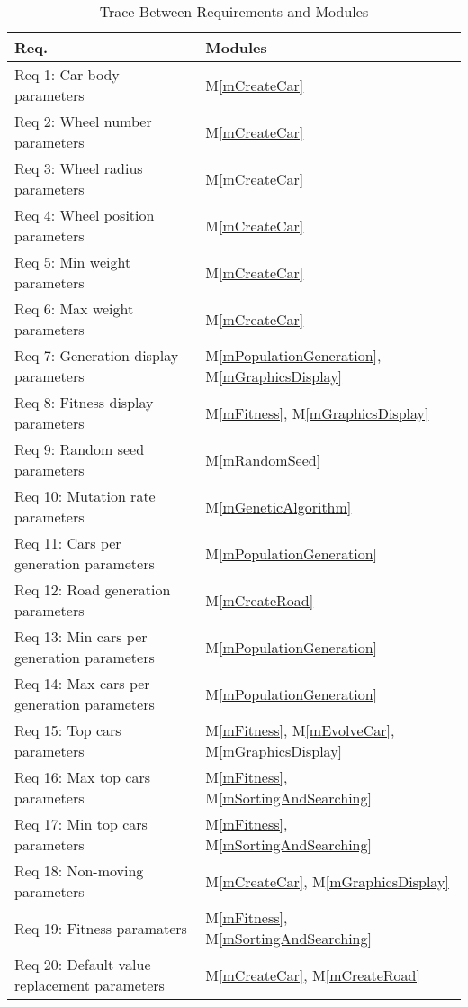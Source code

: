 \documentclass[12pt, titlepage]{article}
\newcommand{\mref}[1]{M\ref{#1}}
\begin{document}
\begin{table}[H]
\centering
\begin{tabular}{p{} p{}}
\toprule
\textbf{Req.} & \textbf{Modules}\\
\midrule
Req 1: Car body parameters & \mref{mCreateCar}\\
Req 2: Wheel number parameters & \mref{mCreateCar}\\
Req 3: Wheel radius parameters & \mref{mCreateCar}\\
Req 4: Wheel position parameters & \mref{mCreateCar}\\
Req 5: Min weight parameters & \mref{mCreateCar}\\
Req 6: Max weight parameters & \mref{mCreateCar}\\
Req 7: Generation display parameters & \mref{mPopulationGeneration}, \mref{mGraphicsDisplay}\\
Req 8: Fitness display parameters & \mref{mFitness}, \mref{mGraphicsDisplay}\\
Req 9: Random seed parameters & \mref{mRandomSeed}\\
Req 10: Mutation rate parameters & \mref{mGeneticAlgorithm}\\
Req 11: Cars per generation parameters &\mref{mPopulationGeneration}\\ 
Req 12: Road generation parameters & \mref{mCreateRoad}\\
Req 13: Min cars per generation parameters & \mref{mPopulationGeneration}\\
Req 14: Max cars per generation parameters & \mref{mPopulationGeneration}\\
Req 15: Top cars parameters & \mref{mFitness}, \mref{mEvolveCar}, \mref{mGraphicsDisplay}\\
Req 16: Max top cars parameters & \mref{mFitness}, \mref{mSortingAndSearching}\\
Req 17: Min top cars parameters & \mref{mFitness}, \mref{mSortingAndSearching}\\
Req 18: Non-moving parameters & \mref{mCreateCar}, \mref{mGraphicsDisplay}\\
Req 19: Fitness paramaters & \mref{mFitness}, \mref{mSortingAndSearching}\\
Req 20: Default value replacement parameters & \mref{mCreateCar}, \mref{mCreateRoad}\\

\bottomrule
\end{tabular}
\caption{Trace Between Requirements and Modules}
\label{TblRT}
\end{table}
\end{document}
